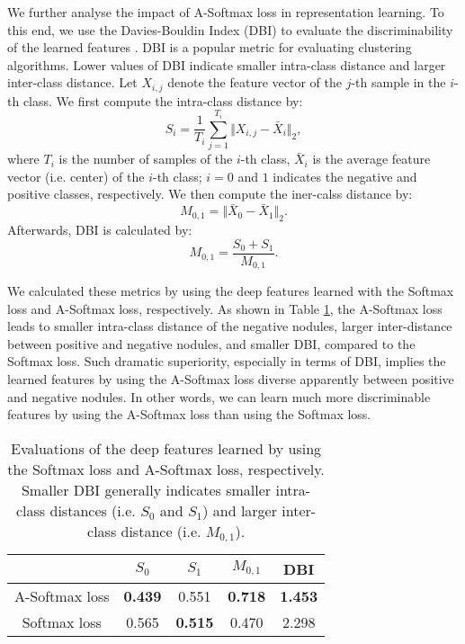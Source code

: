 \documentclass[final,5p,times,twocolumn]{elsarticle}
\begin{document}
We further analyse the impact of A-Softmax loss in representation learning.
 To this end, we use the Davies-Bouldin Index (DBI) to evaluate the discriminability of the learned features \cite{davies1979cluster}. DBI is a popular metric for evaluating clustering algorithms. Lower values of DBI indicate smaller intra-class distance and larger inter-class distance. Let $X_{i,j}$ denote the feature vector of the $j$-th sample in the $i$-th class. We first compute the intra-class distance by:
\begin{equation}
S_i = \frac{1}{T_i} \sum_{j=1}^{T_i} \Vert X_{i,j} - \bar{X}_i \Vert_2,
\end{equation} 
where $T_i$ is the number of samples of the $i$-th class, $\bar{X}_i$ is the average feature vector (i.e. center) of the $i$-th class; $i=0$ and $1$ indicates the negative and positive classes, respectively. We then compute the iner-calss distance by: 
\begin{equation}
M_{0,1} = \Vert \bar{X}_0 - \bar{X}_1 \Vert_2.
\end{equation} 
Afterwards, DBI is calculated by: 
\begin{equation}
M_{0,1} = \frac{S_0 + S_1}{M_{0,1}}.
\end{equation} 

We calculated these metrics by using the deep features learned with the Softmax loss and A-Softmax loss, respectively. As shown in Table \ref{tab:asoft}, the A-Softmax loss leads to smaller intra-class distance of the negative nodules, larger inter-distance between positive and negative nodules, and smaller DBI, compared to the Softmax loss. Such  dramatic superiority, especially in terms of DBI, implies the learned features by using the A-Softmax loss diverse apparently between positive and negative nodules. In other words, we can learn much more discriminable features by using the A-Softmax loss than using the Softmax loss. 
 

\begin{table}
\centering
\caption{Evaluations of the deep features learned by using the Softmax loss and A-Softmax loss, respectively. Smaller DBI generally indicates smaller intra-class distances (i.e. $S_0$ and $S_1$) and larger inter-class distance (i.e. $M_{0,1}$).}
\small
\label{tab:asoft}
\begin{tabular}{c|cccc}
\toprule
& $S_0$ &	$S_1$	& $M_{0,1}$	& DBI \\
\midrule
A-Softmax loss 	& \textbf{0.439}	& 0.551	& \textbf{0.718}	& \textbf{1.453} \\
Softmax loss	& 0.565	& \textbf{0.515}	& 0.470	& 2.298 \\
\bottomrule												
\end{tabular}
\end{table}
\end{document}
